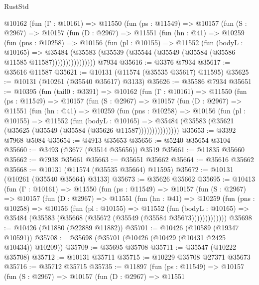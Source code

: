 \begin{lexlean}{RustStd}
\begin{coremodule}
      @10162
        (fun (Γ : @10161) =>
        @11550
          (fun (ps : @11549) =>
          @10157
            (fun (S : @2967) =>
            @10157
              (fun (D : @2967) =>
              @11551
                (fun (hn : @41) =>
                @10259
                  (fun (pns : @10258) =>
                  @10156
                    (fun (pl : @10155) =>
                    @11552
                      (fun (bodyL : @10165) =>
                      @35484
                        (@35583
                          (@35539 (@35544 (@35549 (@35584 (@35586 @11585 @11587))))))))))))))))
    @7934
@35616 := @3376 @7934
@35617 := @35616 @11587
@35621 := @10131 (@11574 (@35535 @35617) @11595)
@35625 := @10131 (@10261 (@35540 @35617) @3133)
@35626 := @35586 @7934
@35651 := @10395
    (fun (tail0 : @3391) =>
    @10162
      (fun (Γ : @10161) =>
      @11550
        (fun (ps : @11549) =>
        @10157
          (fun (S : @2967) =>
          @10157
            (fun (D : @2967) =>
            @11551
              (fun (hn : @41) =>
              @10259
                (fun (pns : @10258) =>
                @10156
                  (fun (pl : @10155) =>
                  @11552
                    (fun (bodyL : @10165) =>
                    @35484 (@35583 (@35621 (@35625 (@35549 (@35584 (@35626 @11587)))))))))))))))
@35653 := @3392 @7968 @5084
@35654 := @4913 @35653
@35656 := @5240 @35654 @3104
@35660 := @3493 (@3677 (@3514 @35656)) @3519
@35661 := @11835 @35660
@35662 := @7938 @35661
@35663 := @35651 @35662
@35664 := @35616 @35662
@35668 := @10131 (@11574 (@35535 @35664) @11595)
@35672 := @10131 (@10261 (@35540 @35664) @3133)
@35673 := @35626 @35662
@35695 := @10413
    (fun (Γ : @10161) =>
    @11550
      (fun (ps : @11549) =>
      @10157
        (fun (S : @2967) =>
        @10157
          (fun (D : @2967) =>
          @11551
            (fun (hn : @41) =>
            @10259
              (fun (pns : @10258) =>
              @10156
                (fun (pl : @10155) =>
                @11552
                  (fun (bodyL : @10165) =>
                  @35484 (@35583 (@35668 (@35672 (@35549 (@35584 @35673)))))))))))))
@35698 := @10426 (@11880 (@22889 @11882))
@35701 := @10426 (@10589 (@19347 @10591))
@35708 := @35698 (@35701 (@10426 (@10429 (@10431 @2425 @10434)) @10209))
@35709 := @35695 @35708
@35711 := @35547 (@10222 @35708)
@35712 := @10131 @35711
@35715 := @10229 @35708 @27371 @35673
@35716 := @35712 @35715
@35735 := @11897
    (fun (ps : @11549) =>
    @10157
      (fun (S : @2967) =>
      @10157
        (fun (D : @2967) =>
        @11551

\end{coremodule}
\end{lexlean}
